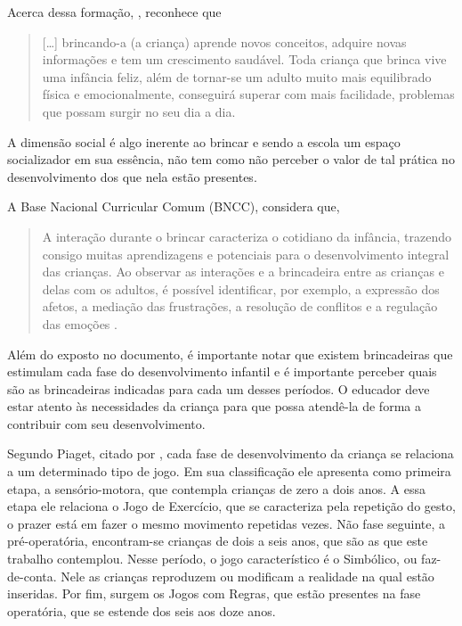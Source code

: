 \begin{refsection}
    Acerca dessa formação, \textcite[p.~20--21]{MALUF2003Brincar}, reconhece que 

    \begin{quotation}
        [\dots] brincando-a (a criança) aprende novos conceitos, adquire novas informações e tem um crescimento saudável. Toda criança que brinca vive uma infância feliz, além de tornar-se um adulto muito mais equilibrado física e emocionalmente, conseguirá superar com mais facilidade, problemas que possam surgir no seu dia a dia. 
    \end{quotation}

    A dimensão social é algo inerente ao brincar e sendo a escola um espaço socializador em sua essência, não tem como não perceber o valor de tal prática no desenvolvimento dos que nela estão presentes. 

    A Base Nacional Curricular Comum (BNCC), considera que, 

    \begin{quotation}
        A interação durante o brincar caracteriza o cotidiano da infância, trazendo consigo muitas aprendizagens e potenciais para o desenvolvimento integral das crianças. Ao observar as interações e a brincadeira entre as crianças e delas com os adultos, é possível identificar, por exemplo, a expressão dos afetos, a mediação das frustrações, a resolução de conflitos e a regulação das emoções \cite[p.~35]{BaNacCurEF2017}. 
    \end{quotation}

    Além do exposto no documento, é importante notar que existem brincadeiras que estimulam cada fase do desenvolvimento infantil e é importante perceber quais são as brincadeiras indicadas para cada um desses períodos. O educador deve estar atento às necessidades da criança para que possa atendê-la de forma a contribuir com seu desenvolvimento. 

    Segundo Piaget, citado por \textcite{KISHIMOTO1999Jogo}, cada fase de desenvolvimento da criança se relaciona a um determinado tipo de jogo. Em sua classificação ele apresenta como primeira etapa, a sensório-motora, que contempla crianças de zero a dois anos. A essa etapa ele relaciona o Jogo de Exercício, que se caracteriza pela repetição do gesto, o prazer está em fazer o mesmo movimento repetidas vezes. Não fase seguinte, a pré-operatória, encontram-se crianças de dois a seis anos, que são as que este trabalho contemplou. Nesse período, o jogo característico é o Simbólico, ou faz-de-conta. Nele as crianças reproduzem ou modificam a realidade na qual estão inseridas. Por fim, surgem os Jogos com Regras, que estão presentes na fase operatória, que se estende dos seis aos doze anos.  


\end{refsection}
